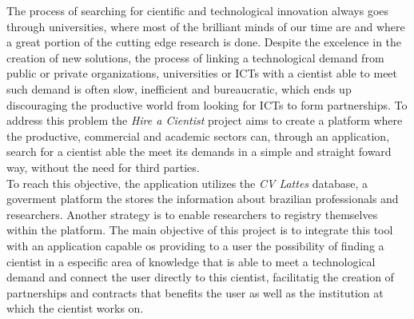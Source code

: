 \begin{abstractutfpr}
    The process of searching for cientific and technological innovation always goes through universities, where most of the brilliant minds of our time are and where a great portion of the cutting edge research is done. Despite the excelence in the creation of new solutions, the process of linking a technological demand from public or private organizations, universities or ICTs with a cientist able to meet such demand is often slow, inefficient and bureaucratic, which ends up discouraging the productive world from looking for ICTs to form partnerships. To address this problem the \emph{Hire a Cientist} project aims to create a platform where the productive, commercial and academic sectors can, through an application, search for a cientist able the meet its demands in a simple and straight foward way, without the need for third parties.
    \\
    To reach this objective, the application utilizes the \emph{CV Lattes} database, a goverment platform the stores the information about brazilian professionals and researchers. Another strategy is to enable researchers to registry themselves within the platform. The main objective of this project is to integrate this tool with an application capable os providing to a user the possibility of finding a cientist in a especific area of knowledge that is able to meet a technological demand and connect the user directly to this cientist, facilitatig the creation of partnerships and contracts that benefits the user as well as the institution at which the cientist works on.
\end{abstractutfpr}

